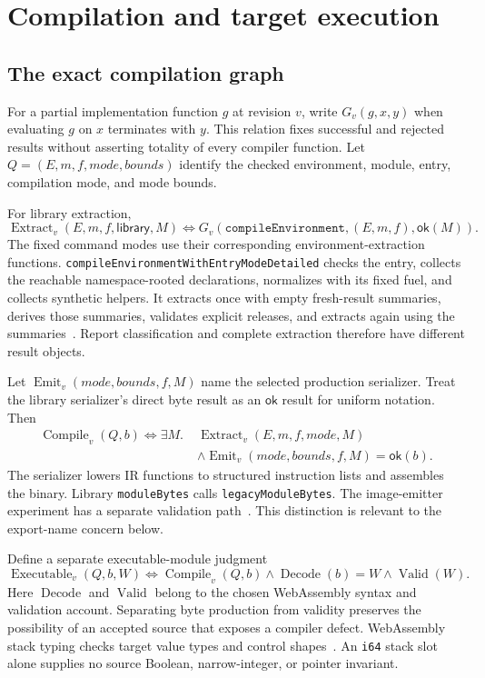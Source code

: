 \documentclass[11pt]{article}
\newcommand{\code}[1]{\texttt{#1}}
\newcommand{\ty}[1]{\mathsf{#1}}
\newcommand{\ok}{\mathsf{ok}}
\begin{document}
\section{Compilation and target execution}

\subsection{The exact compilation graph}

For a partial implementation function $g$ at revision $v$, write $G_v(g,x,y)$ when evaluating $g$ on $x$ terminates with $y$.  This relation fixes successful and rejected results without asserting totality of every compiler function.  Let $Q=(E,m,f,\mathit{mode},\mathit{bounds})$ identify the checked environment, module, entry, compilation mode, and mode bounds.

For library extraction,
\[
\operatorname{Extract}_v(E,m,f,\ty{library},M)
\iff G_v(\code{compileEnvironment},(E,m,f),\ok(M)).
\]
The fixed command modes use their corresponding environment-extraction functions.  \code{compileEnvironmentWithEntryModeDetailed} checks the entry, collects the reachable namespace-rooted declarations, normalizes with its fixed fuel, and collects synthetic helpers.  It extracts once with empty fresh-result summaries, derives those summaries, validates explicit releases, and extracts again using the summaries~\cite{extract}.  Report classification and complete extraction therefore have different result objects.

Let $\operatorname{Emit}_v(\mathit{mode},\mathit{bounds},f,M)$ name the selected production serializer.  Treat the library serializer's direct byte result as an $\ok$ result for uniform notation.  Then
\begin{align*}
\operatorname{Compile}_v(Q,b)\iff\exists M.\;&
\operatorname{Extract}_v(E,m,f,\mathit{mode},M)\\
&\land\operatorname{Emit}_v(\mathit{mode},\mathit{bounds},f,M)=\ok(b).
\end{align*}
The serializer lowers IR functions to structured instruction lists and assembles the binary.  Library \code{moduleBytes} calls \code{legacyModuleBytes}.  The image-emitter experiment has a separate validation path~\cite{binary}.  This distinction is relevant to the export-name concern below.

Define a separate executable-module judgment
\[
\operatorname{Executable}_v(Q,b,W)
\iff\operatorname{Compile}_v(Q,b)\land\operatorname{Decode}(b)=W
       \land\operatorname{Valid}(W).
\]
Here $\operatorname{Decode}$ and $\operatorname{Valid}$ belong to the chosen WebAssembly syntax and validation account.  Separating byte production from validity preserves the possibility of an accepted source that exposes a compiler defect.  WebAssembly stack typing checks target value types and control shapes~\cite{wasm}.  An \code{i64} stack slot alone supplies no source Boolean, narrow-integer, or pointer invariant.
\end{document}
